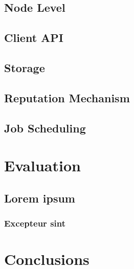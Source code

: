 \documentclass{./llncs2e/llncs}
\begin{document}
\subsection{Node Level}

\subsection{Client API}

\subsection{Storage}

\subsection{Reputation Mechanism}

\subsection{Job Scheduling}




% 
% 

\section{Evaluation}

\subsection{Lorem ipsum}

\subsubsection{Excepteur sint}



% 
% 

\section{Conclusions}
\end{document}
